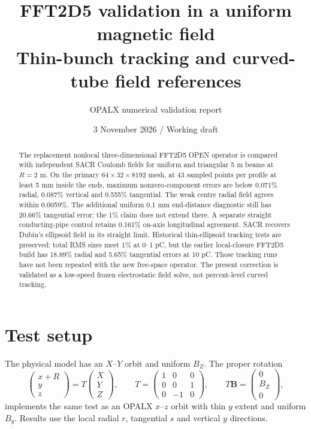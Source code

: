\documentclass[10pt,a4paper]{article}
\title{\vspace{-1.4em}\textbf{FFT2D5 validation in a uniform magnetic field}\\[0.4em]
\large Thin-bunch tracking and curved-tube field references}
\author{OPALX numerical validation report}
\date{3 November 2026 \quad / \quad Working draft}
\begin{document}
\maketitle
\vspace{-1em}
\begin{abstract}
The replacement nonlocal three-dimensional FFT2D5 OPEN operator is compared with independent SACR
Coulomb fields for uniform and triangular 5 m beams at $R=2$ m. On the primary
$64\times32\times8192$ mesh, at 43 sampled points per profile at least 5 mm
inside the ends, maximum nonzero-component
errors are below 0.071\% radial, 0.087\% vertical and 0.555\% tangential.
The weak centre radial field agrees within 0.0059\%. The additional uniform
0.1 mm end-distance diagnostic still has 20.66\% tangential error; the 1\%
claim does not extend there. A separate straight conducting-pipe control
retains 0.161\% on-axis longitudinal agreement.
SACR recovers Dubin's ellipsoid field in its straight limit. Historical
thin-ellipsoid tracking tests are preserved: total RMS sizes meet 1\% at
0--1 pC, but the earlier local-closure FFT2D5 build has 18.89\% radial and
5.65\% tangential errors at 10 pC. Those tracking runs have not been repeated
with the new free-space operator. The present correction is validated as a
low-speed frozen electrostatic field solve, not percent-level curved tracking.
\end{abstract}

\section{Test setup}
The physical model has an $X$--$Y$ orbit and uniform $B_Z$. The proper rotation
\begin{equation}
 \begin{pmatrix}x+R\\y\\z\end{pmatrix}
 =T\begin{pmatrix}X\\Y\\Z\end{pmatrix},\qquad
 T=\begin{pmatrix}1&0&0\\0&0&1\\0&-1&0\end{pmatrix},\qquad
 T\bm B=\begin{pmatrix}0\\B_Z\\0\end{pmatrix},
 \label{eq:coordinates}
\end{equation}
implements the same test as an OPALX $x$--$z$ orbit with thin $y$ extent and
uniform $B_y$. Results use the local radial $r$, tangential $s$ and vertical
$y$ directions.
\end{document}
